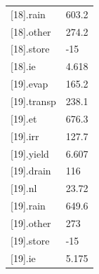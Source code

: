 {\begin{longtable}{p{}p{}}
{}[18].rain & 603.2\\
{}[18].other & 274.2\\
{}[18].store & -15\\
{}[18].ie & 4.618\\
{}[19].evap & 165.2\\
{}[19].transp & 238.1\\
{}[19].et & 676.3\\
{}[19].irr & 127.7\\
{}[19].yield & 6.607\\
{}[19].drain & 116\\
{}[19].nl & 23.72\\
{}[19].rain & 649.6\\
{}[19].other & 273\\
{}[19].store & -15\\
{}[19].ie & 5.175\\
\bottomrule\end{longtable}}
